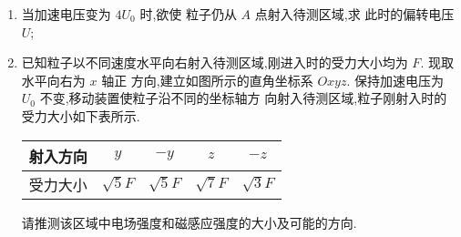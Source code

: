 \begin{enumerate}
\begin{enumerate}
\item 
当加速电压变为 $ 4U_{0} $ 时,欲使
粒子仍从 $ A $ 点射入待测区域,求
此时的偏转电压 $ U $;


\item 
已知粒子以不同速度水平向右射入待测区域,刚进入时的受力大小均为 $ F $. 现取水平向右为 $ x $ 轴正
方向,建立如图所示的直角坐标系 $ Oxyz $. 保持加速电压为 $ U_{0} $ 不变,移动装置使粒子沿不同的坐标轴方
向射入待测区域,粒子刚射入时的受力大小如下表所示.
\begin{table}[h!]
 \centering 
 \begin{tabular}{|c|c|c|c|c|}
 	\hline 射入方向 & $y$ & $-y$ & $z$ & $-z$ \\
 	\hline 受力大小 & $\sqrt{5} F$ & $\sqrt{5} F$ & $\sqrt{7} F$ & $\sqrt{3} F$ \\
 	\hline
 \end{tabular}
 \end{table} 

请推测该区域中电场强度和磁感应强度的大小及可能的方向.

\end{enumerate}
\begin{figure}[h!]
	\flushright
	
\end{figure}




\end{enumerate}

